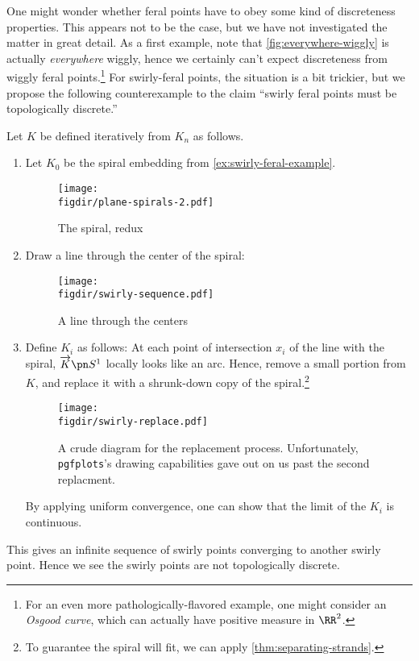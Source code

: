 
One might wonder whether feral points have to obey some kind of
discreteness properties. This appears not to be the case, but we have
not investigated the matter in great detail. As a first example, note
that \cref{fig:everywhere-wiggly} is actually \emph{everywhere}
wiggly, hence we certainly can't expect discreteness from wiggly feral
points.\footnote{For an even more pathologically-flavored example, one
  might consider an \emph{Osgood curve}, which can actually have
  positive measure in $\RR^2$.} For swirly-feral points, the situation
is a bit trickier, but we propose the following counterexample to the
claim ``swirly feral points must be topologically discrete.''
\begin{counterexample}
  Let $K$ be defined iteratively from $K_n$ as follows.
  \begin{enumerate}
    \item Let $K_0$ be the spiral embedding from
      \cref{ex:swirly-feral-example}.
      \begin{figure}[H]
        \centering
        \texttt{[image: \\figdir/plane-spirals-2.pdf]}
        \caption{The spiral, redux}
      \end{figure}
    \item Draw a line through the center of the spiral:
      \begin{figure}[H]
        \centering
        \texttt{[image: \\figdir/swirly-sequence.pdf]}
        \caption{A line through the centers}
      \end{figure}
    \item Define $K_i$ as follows: At each point of intersection $x_i$
      of the line with the spiral, $\fim{K}{S^1}$ locally looks like
      an arc. Hence, remove a small portion from $K$, and replace it
      with a shrunk-down copy of the spiral.\footnote{To guarantee the
      spiral will fit, we can apply \cref{thm:separating-strands}.}
      \begin{figure}[H]
        \centering
        \texttt{[image: \\figdir/swirly-replace.pdf]}
        \caption[Replacement process]{A crude diagram for the
          replacement process. Unfortunately, \texttt{pgfplots}'s
          drawing capabilities gave out on us past the second
          replacment.}
      \end{figure}
      By applying uniform convergence, one can show that the limit of
      the $K_i$ is continuous.
  \end{enumerate}
  This gives an infinite sequence of swirly points converging to
  another swirly point. Hence we see the swirly points are not
  topologically discrete.
\end{counterexample}
